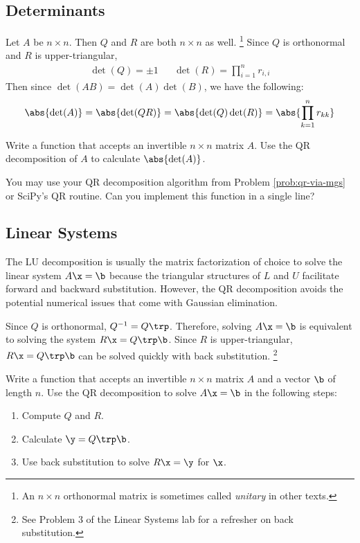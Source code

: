 \subsection*{Determinants} %

Let $A$ be $n \times n$.
Then $Q$ and $R$ are both $n \times n$ as well.%
\footnote{An $n \times n$ orthonormal matrix is sometimes called \emph{unitary} in other texts.}
Since $Q$ is orthonormal and $R$ is upper-triangular,
\begin{align*} \det(Q) = \pm 1 && \det(R) = \prod_{i=1}^n r_{i,i} \end{align*}
Then since $\det(AB) = \det(A)\det(B)$, we have the following:
\[\abs{\det(A)} = \abs{\det(QR)} = \abs{\det(Q)\det(R)} = \abs{\prod_{k=1}^n r_{kk}}\]

\begin{problem} %
Write a function that accepts an invertible $n \times n$ matrix $A$.
Use the QR decomposition of $A$ to calculate $\abs{\det(A)}$.

You may use your QR decomposition algorithm from Problem \ref{prob:qr-via-mgs} or SciPy's QR routine.
Can you implement this function in a single line?
\end{problem}

\subsection*{Linear Systems} %

The LU decomposition is usually the matrix factorization of choice to solve the linear system $A\x = \b$ because the triangular structures of $L$ and $U$ facilitate forward and backward substitution.
However, the QR decomposition avoids the potential numerical issues that come with Gaussian elimination.

Since $Q$ is orthonormal, $Q^{-1}= Q\trp$.
Therefore, solving $A\x = \b$ is equivalent to solving the system $R\x = Q\trp\b$.
Since $R$ is upper-triangular, $R\x = Q\trp\b$ can be solved quickly with back substitution.%
\footnote{See Problem 3 of the Linear Systems lab for a refresher on back substitution.}

\begin{problem} %
Write a function that accepts an invertible $n \times n$ matrix $A$ and a vector $\b$ of length $n$.
Use the QR decomposition to solve $A\x = \b$ in the following steps:
\begin{enumerate}
    \item Compute $Q$ and $R$.
    \item Calculate $\y = Q\trp\b$.
    \item Use back substitution to solve $R\x = \y$ for $\x$.
\end{enumerate}
\end{problem}

